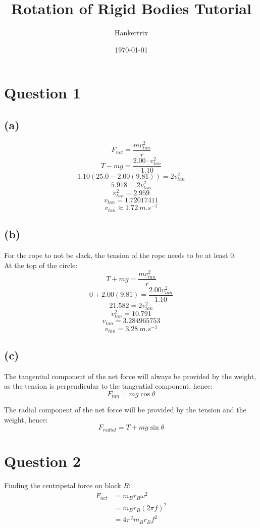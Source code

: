 \documentclass[11pt]{article}
\author{Hankertrix}
\date{\today}
\title{Rotation of Rigid Bodies Tutorial}
\begin{document}
\maketitle
\setcounter{tocdepth}{2}
\tableofcontents

\newpage

\section{Question 1}
\label{sec:orga2b8730}

\subsection{(a)}
\label{sec:orgb10b3fa}
\[F_{net} = \frac{mv_{tan}^2}{r}\]
\[T - mg = \frac{2.00 \cdot v_{tan}^2}{1.10}\]
\[1.10(25.0 - 2.00(9.81)) = 2 v_{tan}^2\]
\[5.918 = 2 v_{tan}^2\]
\[v_{tan}^2 = 2.959\]
\[v_{tan} = 1.72017411\]
\[v_{tan} \approx \qty{1.72}{\unit{m.s^{-1}}}\]

\subsection{(b)}
\label{sec:orgeb01ae4}
For the rope to not be slack, the tension of the rope needs to be at least 0.
\\[0pt]

At the top of the circle:
\[T + mg = \frac{mv_{tan}^2}{r}\]
\[0 + 2.00(9.81) = \frac{2.00v_{tan}^2}{1.10}\]
\[21.582 = 2v_{tan}^2\]
\[v_{tan}^2 = 10.791\]
\[v_{tan} = 3.284965753\]
\[v_{tan} = \qty{3.28}{\unit{m.s^{-1}}}\]

\subsection{(c)}
\label{sec:orgdd24736}

The tangential component of the net force will always be provided by the weight, as the tension is perpendicular to the tangential component, hence:
\[F_{tan} = mg \cos \theta\]

The radial component of the net force will be provided by the tension and the weight, hence:
\[F_{radial} = T + mg \sin \theta\]


\section{Question 2}
\label{sec:org45cfcad}

Finding the centripetal force on block \(B\):
\begin{align*}
F_{net} &= m_B r_B \omega^2 \\
&= m_B r_B (2 \pi f)^2 \\
&= 4 \pi^2 m_B r_B f^2
\end{align*}
\end{document}
